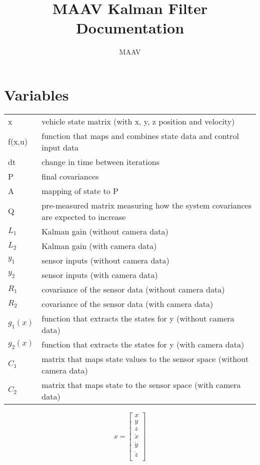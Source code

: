 \documentclass{article}
\begin{document}
\title{MAAV Kalman Filter Documentation}
\author{MAAV}
\date{}
\maketitle

\section{Variables}

\begin{table}[h]
    \begin{tabular}{ll}
        x & vehicle state matrix (with x, y, z position and velocity)\\ 
	    f(x,u) & function that maps and combines state data and control input data\\
	    dt & change in time between iterations\\
	    P & final covariances\\
	    A & mapping of state to P\\
	    Q & pre-measured matrix measuring how the system covariances are expected to increase\\
	    $L_1$ & Kalman gain (without camera data)\\
	    $L_2$ & Kalman gain (with camera data)\\
	    $y_1$ & sensor inputs (without camera data)\\
	    $y_2$ & sensor inputs (with camera data)\\
	    $R_1$ & covariance of the sensor data (without camera data)\\
	    $R_2$ & covariance of the sensor data (with camera data)\\
	    $g_1(x)$ & function that extracts the states for y (without camera data)\\
	    $g_2(x)$ & function that extracts the states for y (with camera data)\\
        $C_1$ & matrix that maps state values to the sensor space (without camera data)\\
        $C_2$ & matrix that maps state to the sensor space (with camera data)\\
	\end{tabular}
\end{table}

\[
	x=
	\left[ {\begin{array}{cccccc}
				x\\
				y\\
				z\\
				\dot x\\
				\dot y\\
				\dot z\\
	\end{array} } \right]
\]
\end{document}
